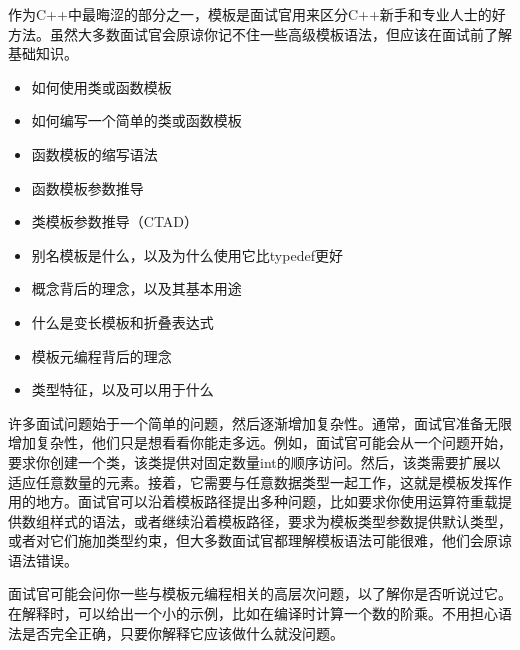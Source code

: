 
作为C++中最晦涩的部分之一，模板是面试官用来区分C++新手和专业人士的好方法。虽然大多数面试官会原谅你记不住一些高级模板语法，但应该在面试前了解基础知识。


\begin{itemize}
\item
如何使用类或函数模板

\item
如何编写一个简单的类或函数模板

\item
函数模板的缩写语法

\item
函数模板参数推导

\item
类模板参数推导（CTAD）

\item
别名模板是什么，以及为什么使用它比typedef更好

\item
概念背后的理念，以及其基本用途

\item
什么是变长模板和折叠表达式

\item
模板元编程背后的理念

\item
类型特征，以及可以用于什么
\end{itemize}


许多面试问题始于一个简单的问题，然后逐渐增加复杂性。通常，面试官准备无限增加复杂性，他们只是想看看你能走多远。例如，面试官可能会从一个问题开始，要求你创建一个类，该类提供对固定数量int的顺序访问。然后，该类需要扩展以适应任意数量的元素。接着，它需要与任意数据类型一起工作，这就是模板发挥作用的地方。面试官可以沿着模板路径提出多种问题，比如要求你使用运算符重载提供数组样式的语法，或者继续沿着模板路径，要求为模板类型参数提供默认类型，或者对它们施加类型约束，但大多数面试官都理解模板语法可能很难，他们会原谅语法错误。

面试官可能会问你一些与模板元编程相关的高层次问题，以了解你是否听说过它。在解释时，可以给出一个小的示例，比如在编译时计算一个数的阶乘。不用担心语法是否完全正确，只要你解释它应该做什么就没问题。









